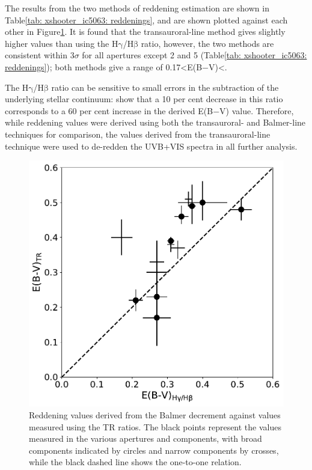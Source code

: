 The results from the two methods of reddening estimation are shown in Table\;\ref{tab: xshooter_ic5063: reddenings}, and are shown plotted against each other in \mbox{Figure\;\ref{fig: xshooter_ic5063: tr_balmer_reddening}}. It is found that the transauroral-line method gives slightly higher values than using the H$\mathrm{\gamma}$/H$\mathrm{\beta}$ ratio, however, the two methods are consistent within 3$\sigma$ for all apertures except 2 and 5 (Table\;\ref{tab: xshooter_ic5063: reddenings}); both methods give a range of \mbox{0.17\;\textless\;E(B$-$V)\;\textless{}}.

The H$\mathrm{\gamma}$/H$\mathrm{\beta}$ ratio can be sensitive to small errors in the subtraction of the underlying stellar continuum: \citet{Rose2018} show that a 10 per cent decrease in this ratio corresponds to a 60 per cent increase in the derived E(B$-$V) value. Therefore, while reddening values were derived using both the transauroral- and Balmer-line techniques for comparison, the values derived from the transauroral-line technique were used to de-redden the UVB+VIS spectra in all further analysis.

\begin{figure}[!t]
	\centering
	\includegraphics[width=0.75\linewidth]{figures/xshooter_ic5063/tr_balmer_reddening.pdf}
	\caption[Reddening values derived from the Balmer decrement plotted against values measured using the transauroral line technique.]{Reddening values derived from the Balmer decrement against values measured using the TR ratios. The black points represent the values measured in the various apertures and components, with broad components indicated by circles and narrow components by crosses, while the black dashed line shows the one-to-one relation. }
	\label{fig: xshooter_ic5063: tr_balmer_reddening}
\end{figure} 

